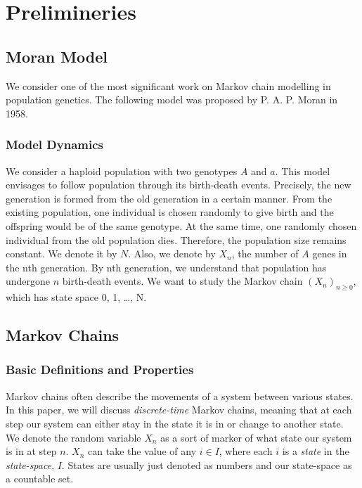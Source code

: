 \chapter{Prelimineries}
\section{Moran Model}
We consider one of the most significant work on Markov chain modelling in population genetics. The following model was proposed by P. A. P. Moran in 1958.
\subsection{Model Dynamics}
We consider a haploid population with two genotypes $A$ and $a$. This model envisages to follow population through its birth-death events. Precisely, the new generation is formed from the old generation in a certain manner.
\newline
From the existing population, one individual is chosen randomly to give birth and the offspring would be of the same genotype. At the same time, one randomly chosen individual from the old population dies. Therefore, the population size remains constant. We denote it by $N$. Also, we denote by $X_{n}$, the number of $A$ genes in the nth generation. By nth generation, we understand that population has undergone $n$ birth-death events. We want to study the Markov chain $(X_{n})_{n\geq0}$, which has state space {0, 1, \ldots, N}.   
\section{Markov Chains}
\subsection{Basic Definitions and Properties}

Markov chains often describe the movements of a system between various states. In this paper, we will discuss \emph{discrete-time} Markov chains, meaning that at each step our system can either stay in the state it is in or change to another state. We denote the random variable $X_n$ as a sort of marker of what state our system is in at step $n$. $X_n$ can take the value of any $i \in I$, where each $i$ is a \emph{state} in the \emph{state-space}, $I$. States are usually just denoted as numbers and our state-space as a countable set.

